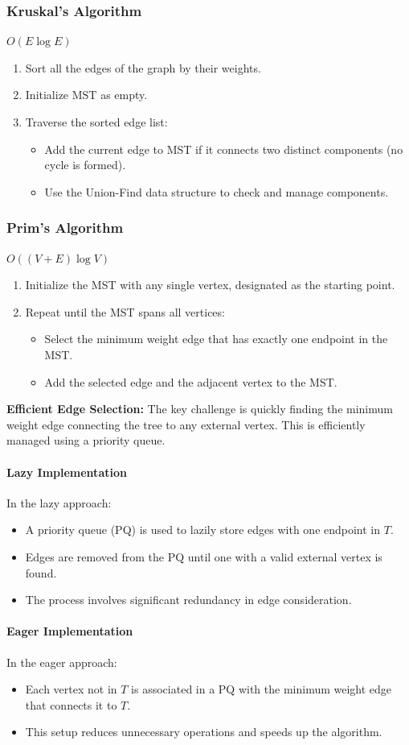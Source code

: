 \documentclass{article}
\begin{document}
\subsubsection{Kruskal's Algorithm}

$O(E \log E)$

\begin{enumerate}
  \item Sort all the edges of the graph by their weights.
  \item Initialize MST as empty.
  \item Traverse the sorted edge list:
    \begin{itemize}
      \item Add the current edge to MST if it connects two distinct components (no cycle is formed).
      \item Use the Union-Find data structure to check and manage components.
    \end{itemize}
\end{enumerate}

\subsubsection{Prim's Algorithm}

$O((V + E) \log V)$

\begin{enumerate}
  \item Initialize the MST with any single vertex, designated as the starting point.
  \item Repeat until the MST spans all vertices:
  \begin{itemize}
    \item Select the minimum weight edge that has exactly one endpoint in the MST.
    \item Add the selected edge and the adjacent vertex to the MST.
  \end{itemize}
\end{enumerate}

\textbf{Efficient Edge Selection:} The key challenge is quickly finding the minimum weight edge connecting the tree to any external vertex. This is efficiently managed using a priority queue.

\paragraph{Lazy Implementation}
In the lazy approach:
\begin{itemize}
  \item A priority queue (PQ) is used to lazily store edges with one endpoint in $T$.
  \item Edges are removed from the PQ until one with a valid external vertex is found.
  \item The process involves significant redundancy in edge consideration.
\end{itemize}

\paragraph{Eager Implementation}
In the eager approach:
\begin{itemize}
  \item Each vertex not in $T$ is associated in a PQ with the minimum weight edge that connects it to $T$.
  \item This setup reduces unnecessary operations and speeds up the algorithm.
\end{itemize}
\end{document}
